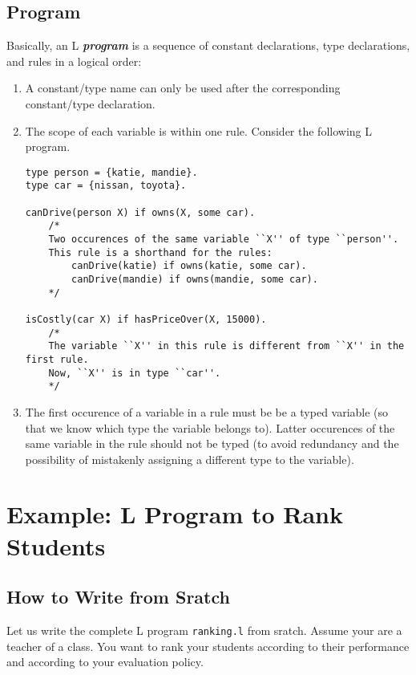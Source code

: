 \documentclass[letterpaper,10pt]{article}
\begin{document}
\begin{flushleft}
\subsection{Program} \label{progdef}

Basically, an L \textbf{\textit{program}} is a sequence of constant declarations, type declarations, and rules in a logical order:
\begin{enumerate}
\item
A constant/type name can only be used after the corresponding constant/type declaration.

\item
The scope of each variable is within one rule. Consider the following L program.
\begin{verbatim}
type person = {katie, mandie}.
type car = {nissan, toyota}.

canDrive(person X) if owns(X, some car).
	/* 
	Two occurences of the same variable ``X'' of type ``person''.
	This rule is a shorthand for the rules:
		canDrive(katie) if owns(katie, some car).
		canDrive(mandie) if owns(mandie, some car). 
	*/

isCostly(car X) if hasPriceOver(X, 15000).
	/* 
	The variable ``X'' in this rule is different from ``X'' in the first rule.
	Now, ``X'' is in type ``car''.
	*/
\end{verbatim}

\item
The first occurence of a variable in a rule must be be a typed variable (so that we know which type the variable belongs to). Latter occurences of the same variable in the rule should not be typed (to avoid redundancy and the possibility of mistakenly assigning a different type to the variable).
\end{enumerate}

\pagebreak

\section{Example: L Program to Rank Students}

\subsection{How to Write from Sratch}


Let us write the complete L program \texttt{ranking.l} from sratch. Assume your are a teacher of a class. You want to rank your students according to their performance and according to your evaluation policy. 


\end{flushleft}
\end{document}
